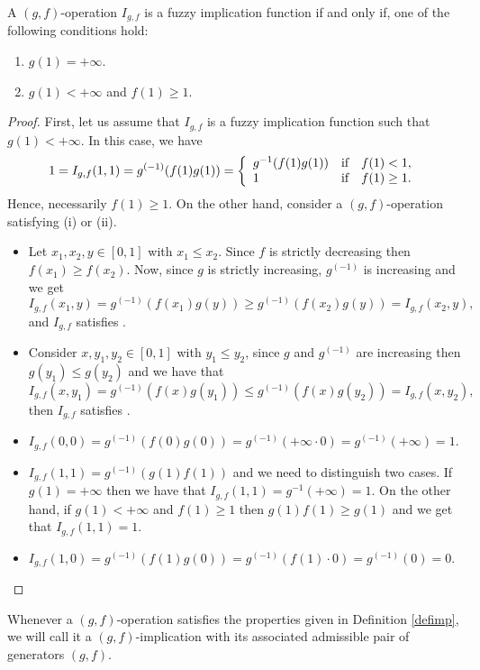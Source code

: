 \begin{theorem}\label{th:(g,f)implications} A $(g,f)$-operation $I_{g,f}$ is a fuzzy implication function if and only if, one of the following conditions hold:
	\begin{enumerate}[label=(\roman*)]
		\item $g(1)= + \infty$.
		\item $g(1)< + \infty$ and $f(1) \geq 1$.
	\end{enumerate}
\end{theorem}
\begin{proof}
	First, let us assume that $I_{g,f}$ is a fuzzy implication function such that $g(1) < + \infty$. In this case, we have
	$$1=I_{g,f}(1,1)=g^{(-1)}(f(1)g(1))=  \left\{ \begin{array}{lcc}
		g^{-1}(f(1)g(1)) &   \hbox{if}  & f(1) < 1, \\
		1 &  \hbox{if} & f(1)\geq 1.
	\end{array}
	\right.
	$$
	Hence, necessarily $f(1) \geq 1$. On the other hand, consider a $(g,f)$-operation satisfying (i) or (ii). 
	\begin{itemize}
		\item Let $x_1,x_2,y \in [0,1]$ with $x_1 \leq x_2$. Since $f$ is strictly decreasing then $f(x_1) \geq f(x_2)$. Now, since $g$ is strictly increasing, $g^{(-1)}$ is increasing and we get
		$$ I_{g,f}(x_1,y)=g^{(-1)}(f(x_1)g(y)) \geq g^{(-1)}(f(x_2)g(y)) = I_{g,f}(x_2,y),$$
		and $I_{g,f}$ satisfies \Ione.
		
		\item Consider $x,y_1,y_2 \in [0,1]$ with $y_1 \leq y_2$, since $g$ and $g^{(-1)}$ are increasing then $g(y_1) \leq g(y_2)$ and we have that
		$$I_{g,f}(x,y_1)=g^{(-1)}(f(x)g(y_1)) \leq g^{(-1)}(f(x)g(y_2)) = I_{g,f}(x,y_2),$$
		then $I_{g,f}$ satisfies \Itwo.
		\item $I_{g,f}(0,0)=g^{(-1)}(f(0)g(0))=g^{(-1)}(+\infty \cdot 0) = g^{(-1)}(+\infty)=1$.
		\item $I_{g,f}(1,1)=g^{(-1)}(g(1)f(1))$ and we need to distinguish two cases. If $g(1)=+ \infty$ then we have that $I_{g,f}(1,1)=g^{-1}(+ \infty)=1$. On the other hand, if $g(1) < +\infty$ and $f(1) \geq 1$ then $g(1)f(1) \geq g(1)$ and we get that $I_{g,f}(1,1)=1$.
		\item $I_{g,f}(1,0)=g^{(-1)}(f(1)g(0))=g^{(-1)}(f(1) \cdot 0 )=g^{(-1)}(0)=0$.
	\end{itemize}
\end{proof}
Whenever a $(g,f)$-operation satisfies the properties given in Definition \ref{defimp}, we will call it a $(g,f)$-implication with its associated admissible pair of generators  $(g,f)$.
